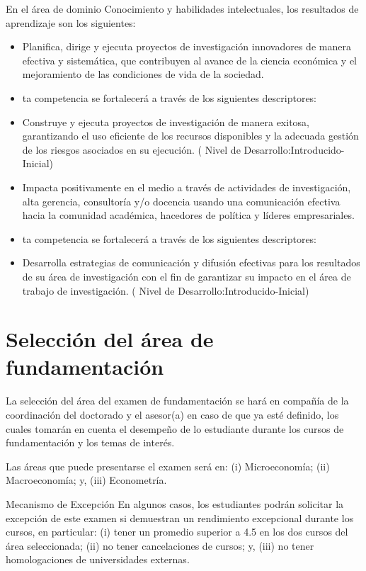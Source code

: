 En el área de dominio Conocimiento y habilidades intelectuales, los resultados de aprendizaje son los siguientes:
\begin{itemize}
\item Planifica, dirige y ejecuta proyectos de investigación innovadores de manera efectiva y sistemática, que contribuyen al avance de la ciencia económica y el mejoramiento de las condiciones de vida de la sociedad.
\item ta competencia se fortalecerá a través de los siguientes descriptores:
\item Construye y ejecuta proyectos de investigación de manera exitosa, garantizando el uso eficiente de los recursos disponibles y la adecuada gestión de los riesgos asociados en su ejecución. ( Nivel de Desarrollo:Introducido-Inicial)
\item Impacta positivamente en el medio a través de actividades de investigación, alta gerencia, consultoría y/o docencia usando una comunicación efectiva hacia la comunidad académica, hacedores de política y líderes empresariales.
\item ta competencia se fortalecerá a través de los siguientes descriptores:
\item Desarrolla estrategias de comunicación y difusión efectivas para los resultados de su área de investigación con el fin de garantizar su impacto en el área de trabajo de investigación. ( Nivel de Desarrollo:Introducido-Inicial)
\end{itemize}

\section{Selección del área de fundamentación}

La selección del área del examen de fundamentación se hará en compañía de la coordinación del doctorado y el asesor(a) en caso de que ya esté definido, los cuales tomarán en cuenta el desempeño de lo estudiante durante los cursos de fundamentación y los temas de interés. 

Las áreas que puede presentarse el examen será en: (i) Microeconomía; (ii) Macroeconomía; y, (iii) Econometría.

\begin{myremark}{Mecanismo de Excepción}
En algunos casos, los estudiantes podrán solicitar la excepción de este examen si demuestran un rendimiento excepcional durante los cursos, en particular: (i) tener un promedio superior a 4.5 en los dos cursos del área seleccionada; (ii) no tener cancelaciones de cursos; y, (iii) no tener homologaciones de universidades externas.
\end{myremark}

